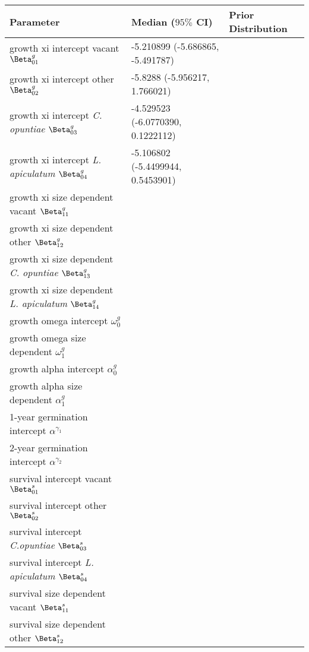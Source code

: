 \documentclass[11pt]{article}
\begin{document}
\renewcommand{\thetable}{\arabic{table}}
\setcounter{table}{0}

  \begin{table}[]
  \begin{tabular}{l|l|l}
    \textbf{Parameter} & \textbf{Median ($95\%$ CI)} & \textbf{Prior Distribution} \\
    \hline
    growth xi intercept vacant $\Beta_{01}^g$ & -5.210899 (-5.686865, -5.491787) & \\
    growth xi intercept other $\Beta_{02}^g$ & -5.8288 (-5.956217, 1.766021) & \\
    growth xi intercept \textit{C. opuntiae} $\Beta_{03}^g$ & -4.529523 (-6.0770390, 0.1222112) & \\
    growth xi intercept \textit{L. apiculatum} $\Beta_{04}^g$ & -5.106802 (-5.4499944, 0.5453901) & \\
    growth xi size dependent vacant $\Beta_{11}^g$ & & \\
    growth xi size dependent other $\Beta_{12}^g$ & & \\
    growth xi size dependent \textit{C. opuntiae} $\Beta_{13}^g$ & & \\
    growth xi size dependent \textit{L. apiculatum} $\Beta_{14}^g$ & & \\
    growth omega intercept $\omega_0^g$ & & \\
    growth omega size dependent $\omega_1^g$ & & \\
    growth alpha intercept $\alpha_0^g$ & & \\
    growth alpha size dependent $\alpha_1^g$ & & \\
    \hline
    1-year germination intercept $\alpha^{\gamma_1}$ & & \\
    2-year germination intercept $\alpha^{\gamma_2}$ & & \\
    \hline
    survival intercept vacant $\Beta_{01}^s$ & & \\
    survival intercept other $\Beta_{02}^s$ & & \\
    survival intercept \textit{C.opuntiae} $\Beta_{03}^s$ & & \\
    survival intercept \textit{L. apiculatum} $\Beta_{04}^s$ & & \\
    survival size dependent vacant $\Beta_{11}^s$ & & \\
    survival size dependent other $\Beta_{12}^s$ & & \\

\end{tabular}
\end{table}
\end{document}
